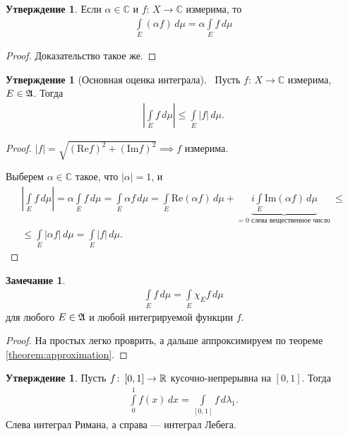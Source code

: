 \documentclass[a4paper,14pt]{extarticle}
\newcounter{theoremCnt}
\theoremstyle{definition}
\theoremstyle{plain}
\theoremstyle{plain}
\theoremstyle{plain}
\theoremstyle{plain}
\theoremstyle{definition}
\theoremstyle{definition}
\newtheorem{remrk}[theoremCnt]{Замечание}
\theoremstyle{definition}
\newtheorem{claim}[theoremCnt]{Утверждение}
\theoremstyle{definition}
\theoremstyle{definition}
\theoremstyle{definition}
\theoremstyle{plain}
\theoremstyle{plain}
\theoremstyle{plain}
\theoremstyle{plain}
\theoremstyle{definition}
\theoremstyle{definition}
\theoremstyle{definition}
\theoremstyle{definition}
\theoremstyle{definition}
\newcommand{\R}{\ensuremath \mathbb{R}}
\newcommand{\A}{\ensuremath \mathfrak{A}}
\begin{document}
\begin{claim}
 Если $\alpha \in \mathbb{C}$ и $f \colon\, X \to \mathbb{C} $ измерима, то \begin{align*}
  \int\limits_E (\alpha f) \, d\mu = \alpha \int\limits_E f\,d\mu
 \end{align*} 
\end{claim}
\begin{proof}
 Доказательство такое же.
\end{proof}
\begin{claim}[Основная оценка интеграла]\
 Пусть $f \colon\, X \to \mathbb{C} $ измерима, $E \in \A$. Тогда \begin{align*}
  \left| \int\limits_E f \, d\mu \right| \leqslant \int\limits_E \left| f \right| \,d\mu
 .\end{align*} 
\end{claim}
\begin{proof}
 $\left| f \right| = \sqrt{(\mathrm{Re} f)^{2} + (\mathrm{Im} f)^{2}} \implies f $ измерима.

 Выберем $\alpha \in \mathbb{C}$ такое, что $\left| \alpha \right| = 1$, и \begin{align*}
  \left| \int\limits_E f\,d\mu \right| = \alpha \int\limits_E f\,d\mu = \int\limits_E \alpha f \,d\mu = \int\limits_E \mathrm{Re}(\alpha f) \,d\mu + \underbrace{i \int\limits_E \mathrm{Im}(\alpha f) \, d\mu}_{= 0 \text{ слева вещественное число }} \leqslant \\ \leqslant \int\limits_E \left| \alpha f \right| \,d\mu = \int\limits_E \left| f \right| \,d\mu
 .\end{align*} 
\end{proof}
\begin{remrk}
 \begin{align*}
  \int\limits_E f\,d\mu = \int\limits_E \chi_E f \,d\mu
 \end{align*} для любого $E \in \A$ и любой интегрируемой функции $f$.
\end{remrk}
\begin{proof}
 На простых легко проврить, а дальше аппроксимируем по теореме \ref{theorem:approximation}.
\end{proof}
\begin{claim}
 Пусть $f \colon\, [0,1] \to \R  $ кусочно-непрерывна на $[0,1]$. Тогда \begin{align*}
  \int\limits_{0}^{1} f(x) \, dx = \int\limits_{[0,1]} f \, d\lambda_1
 .\end{align*}  Слева интеграл Римана, а справа --- интеграл Лебега.
\end{claim}
\end{document}
